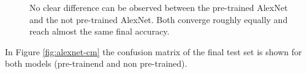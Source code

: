 \begin{figure}[h]
\centering
{}
\caption{No clear difference can be observed between the pre-trained AlexNet and the not pre-trained AlexNet. Both converge roughly equally and reach almost the same final accuracy.}
\label{fig:alexnet-graph}
\end{figure}

In Figure \ref{fig:alexnet-cm} the confusion matrix of the final test set is shown for both models (pre-trainend and non pre-trained). 

